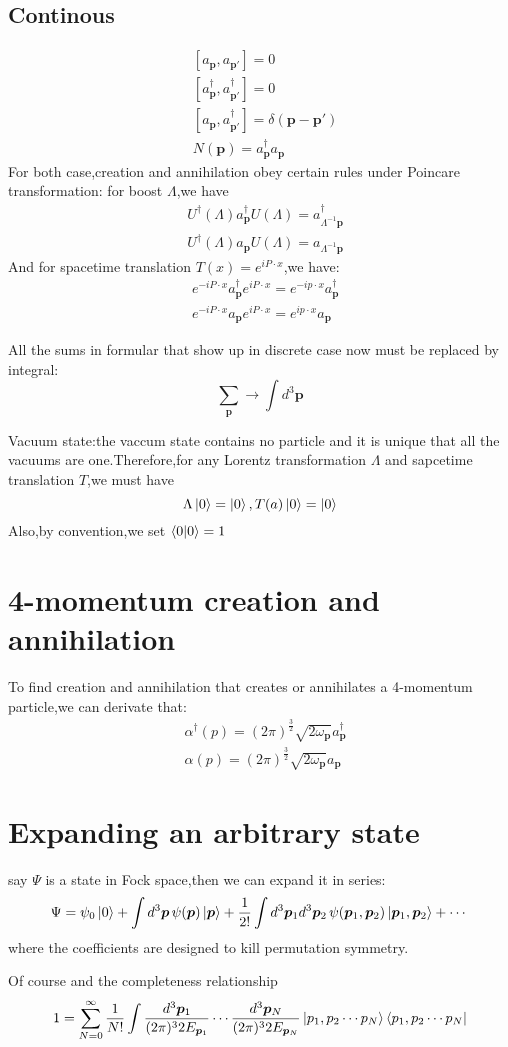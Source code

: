 \documentclass[a4paper]{article}
\begin{document}
\subsection{Continous}
\begin{align*}
	&[a_{\bm{p}},a_{\bm{p}'}]=0\\
	&[a^{\dagger}_{\bm{p}},a^{\dagger}_{\bm{p}'}]=0\\
	&[a_{\bm{p}},a^{\dagger}_{\bm{p}'}]=\delta(\bm{p}-\bm{p}')\\
	&N(\bm{p})=a^{\dagger}_{\bm{p}}a_{\bm{p}}
\end{align*}
For both case,creation and annihilation obey certain rules under Poincare transformation:
for boost $\Lambda$,we have
\begin{align*}
	&U^{\dagger}(\Lambda)a^{\dagger}_{\bm{p}}U(\Lambda)=a^{\dagger}_{\Lambda^{-1}\bm{p}}\\
	&U^{\dagger}(\Lambda)a_{\bm{p}}U(\Lambda)=a_{\Lambda^{-1}\bm{p}}
\end{align*}
And for spacetime translation $T(x)=e^{iP\cdot x}$,we have:
\begin{align*}
	&e^{-iP\cdot x}a^{\dagger}_{\bm{p}}e^{iP\cdot x}=e^{-ip\cdot x}a^{\dagger}_{\bm{p}}\\
	&e^{-iP\cdot x}a_{\bm{p}}e^{iP\cdot x}=e^{ip\cdot x}a_{\bm{p}}
\end{align*}
\par All the sums in formular that show up in discrete case now must be replaced by integral:$$\underset{\bm{p}}{\sum}\rightarrow\int d^3\bm{p}$$
\par Vacuum state:the vaccum state contains no particle and it is unique that all the vacuums are one.Therefore,for any Lorentz transformation $\Lambda$ and sapcetime translation $T$,we must have $$\Lambda\ket{0}=\ket{0},T(a)\ket{0}=\ket{0}$$
Also,by convention,we set $\braket{0|0}=1$
\section{4-momentum creation and annihilation}
To find creation and annihilation that creates or annihilates a 4-momentum particle,we can derivate that:
\begin{align*}
	&\alpha^{\dagger}(p)=(2\pi)^{\frac{3}{2}}\sqrt{2\omega_{\bm{p}}}a^{\dagger}_{\bm{p}}\\
	&\alpha(p)=(2\pi)^{\frac{3}{2}}\sqrt{2\omega_{\bm{p}}}a_{\bm{p}}
\end{align*}
\section{Expanding an arbitrary state}
say $\Psi$ is a state in Fock space,then we can expand it in series:$$\Psi=\psi_0\ket{0}+\int d^3\bm{p}\,\psi(\bm{p})\ket{\bm{p}}+\frac{1}{2!}\int d^3\bm{p}_1 d^3\bm{p}_2\,\psi(\bm{p}_1,\bm{p}_2)\ket{\bm{p}_1,\bm{p}_2}+\cdots
$$where the coefficients are designed to kill permutation symmetry.
\par Of course and the completeness relationship$$1=\sum_{N=0}^{\infty}\frac{1}{N!}\int\frac{d^3\bm{p}_1}{(2\pi)^32E_{\bm{p}_1}}\cdots\frac{d^3\bm{p}_N}{(2\pi)^32E_{\bm{p}_N}}\ket{p_1,p_2\cdots p_N}\bra{p_1,p_2\cdots p_N}$$
\end{document}

